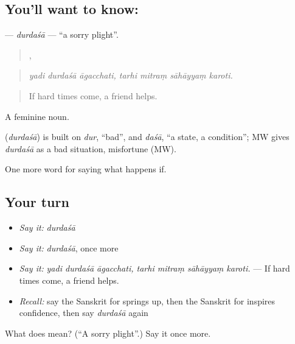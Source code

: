 \subsection*{You'll want to know: }
\textbf{} — \emph{durdaśā} — \textquotedblleft{}a sorry plight\textquotedblright{}.

\begin{quote}
  ,    
\end{quote}

\begin{quote}
\emph{yadi durdaśā āgacchati, tarhi mitraṃ sāhāyyaṃ karoti.}
\end{quote}

\begin{quote}
If hard times come, a friend helps.
\end{quote}

A feminine noun.

\begin{cousinweb}
\textbf{} (\emph{durdaśā}) is built on \emph{dur}, \textquotedblleft{}bad\textquotedblright{}, and \emph{daśā}, \textquotedblleft{}a state, a condition\textquotedblright{}; MW gives \emph{durdaśā} as a bad situation, misfortune (MW).
\end{cousinweb}

\begin{grammarlens}[title={What you've built}]
One more word for saying what happens if.
\end{grammarlens}

\subsection*{Your turn}
\begin{itemize}
\raggedright
  \item \emph{Say it:} \emph{durdaśā}
  \item \emph{Say it:} \emph{durdaśā}, once more
  \item \emph{Say it:} \emph{yadi durdaśā āgacchati, tarhi mitraṃ sāhāyyaṃ karoti.} — If hard times come, a friend helps.
  \item \emph{Recall:} say the Sanskrit for springs up, then the Sanskrit for inspires confidence, then say \emph{durdaśā} again
\end{itemize}

\begin{tcolorbox}[breakable,colback=teal!4,colframe=teal!35!black,title={Before you move on}]
What does  mean? (\textquotedblleft{}A sorry plight\textquotedblright{}.) Say it once more.
\end{tcolorbox}
